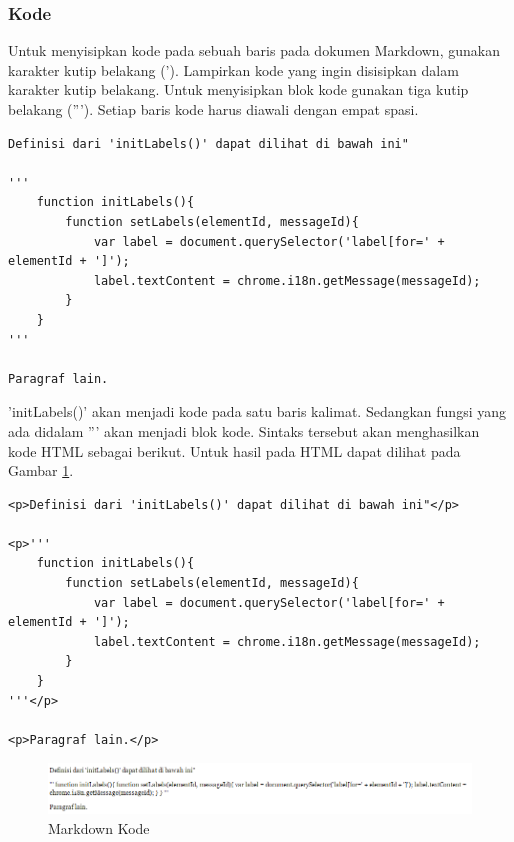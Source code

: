 \subsubsection{Kode}
Untuk menyisipkan kode pada sebuah baris pada dokumen Markdown, gunakan karakter
kutip belakang ('). Lampirkan kode yang ingin disisipkan dalam karakter kutip
belakang. Untuk menyisipkan blok kode gunakan tiga kutip belakang ('''). Setiap
baris kode harus diawali dengan empat spasi.
\begin{lstlisting}
Definisi dari 'initLabels()' dapat dilihat di bawah ini"

'''
    function initLabels(){
        function setLabels(elementId, messageId){
            var label = document.querySelector('label[for=' + elementId + ']');
            label.textContent = chrome.i18n.getMessage(messageId);
        }
    }
'''

Paragraf lain.
\end{lstlisting}
'initLabels()' akan menjadi kode pada satu baris kalimat. Sedangkan fungsi yang
ada didalam ''' akan menjadi blok kode. Sintaks tersebut akan menghasilkan kode
HTML sebagai berikut. Untuk hasil pada HTML dapat dilihat pada Gambar
\ref{fig:kode}.
\begin{lstlisting}
<p>Definisi dari 'initLabels()' dapat dilihat di bawah ini"</p>

<p>'''
    function initLabels(){
        function setLabels(elementId, messageId){
            var label = document.querySelector('label[for=' + elementId + ']');
            label.textContent = chrome.i18n.getMessage(messageId);
        }
    }
'''</p>

<p>Paragraf lain.</p>
\end{lstlisting}
\begin{figure}[H]
\centering
\includegraphics[scale=0.6]{Gambar/kode.png}
\caption[Markdown Kode]{Markdown Kode}
\label{fig:kode}
\end{figure}

